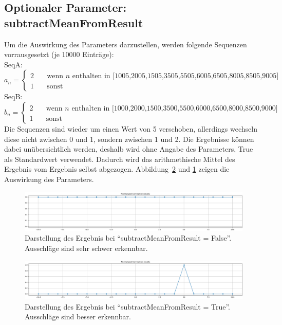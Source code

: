 \subsection{Optionaler Parameter: subtractMeanFromResult}
Um die Auswirkung des Parameters darzustellen, werden folgende Sequenzen vorrausgesetzt (je 10000 Einträge):\\
SeqA:
\[ a_{n} =
  \begin{cases}
    2       & \quad \text{wenn } n \text{ enthalten in [1005,2005,1505,3505,5505,6005,6505,8005,8505,9005]}\\
    1  & \quad \text{sonst}
  \end{cases}
\]
SeqB:
\[ b_{n} =
  \begin{cases}
    2       & \quad \text{wenn } n \text{ enthalten in [1000,2000,1500,3500,5500,6000,6500,8000,8500,9000]}\\
    1  & \quad \text{sonst}
  \end{cases}
\]
Die Sequenzen sind wieder um einen Wert von 5 verschoben, allerdings wechseln diese nicht zwischen 0 und 1, sondern zwischen 1 und 2. 
Die Ergebnisse können dabei unübersichtlich werden, deshalb wird ohne Angabe des Parameters, True als Standardwert verwendet.
Dadurch wird das arithmethische Mittel des Ergebnis vom Ergebnis selbst abgezogen. Abbildung~\ref{fig:correlationSubtractMeamFromResultTrue} 
und \ref{fig:correlationSubtractMeamFromResultFalse} zeigen die Auswirkung des Parameters. 
\begin{figure}[H]
    \includegraphics[width=\linewidth]{./images/correlationSubtractMeamFromResultFalse.PNG}
    \caption[Ergebnis: subtractMeanFromResult = False]{Darstellung des Ergebnis bei \enquote{subtractMeanFromResult = False}. Ausschläge sind sehr schwer erkennbar\footnotemark. }
    \label{fig:correlationSubtractMeamFromResultFalse}
\end{figure}

\begin{figure}[H]
    \includegraphics[width=\linewidth]{./images/correlationSubtractMeamFromResultTrue.PNG}
    \caption[Ergebnis: subtractMeanFromResult = True]{Darstellung des Ergebnis bei \enquote{subtractMeanFromResult = True}. Ausschläge sind besser erkennbar\footnotemark. }
    \label{fig:correlationSubtractMeamFromResultTrue}
\end{figure}

